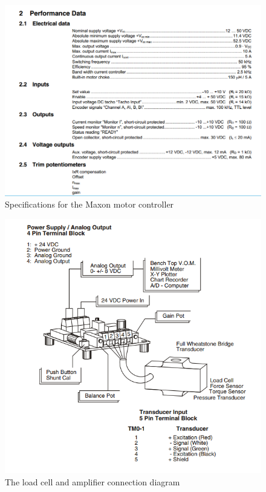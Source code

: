 \documentclass[12pt]{report}
\begin{document}
\begin{figure}[h] 
		\centering
		\includegraphics[width=\linewidth]{motor_controller_spec}
		\caption{Specifications for the Maxon motor controller}
		\label{fig:controller_spec}
	\end{figure}
	
\begin{figure}[h] 
		\centering
		\includegraphics[width=\linewidth]{load_amp}
		\caption{The load cell and amplifier connection diagram}
		\label{fig:load_cell_amp}
	\end{figure}
	
\end{document}
